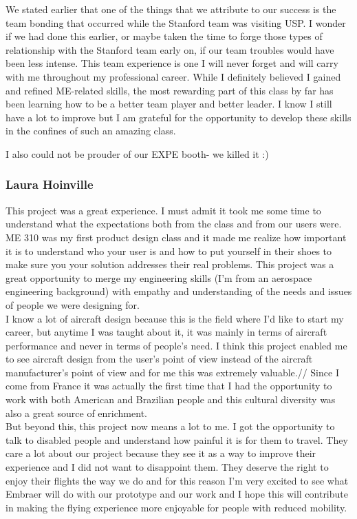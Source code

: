 We stated earlier that one of the things that we attribute to our success is the team bonding that occurred while the Stanford team was visiting USP. I wonder if we had done this earlier, or maybe taken the time to forge those types of relationship with the Stanford team early on, if our team troubles would have been less intense. This team experience is one I will never forget and will carry with me throughout my professional career. While I definitely believed I gained and refined ME-related skills, the most rewarding part of this class by far has been learning how to be a better team player and better leader. I know I still have a lot to improve but I am grateful for the opportunity to develop these skills in the confines of such an amazing class. 

I also could not be prouder of our EXPE booth- we killed it  :)

\subsubsection{Laura Hoinville}

This project was a great experience. I must admit it took me some time to understand what the expectations both from the class and from our users were. ME 310 was my first product design class and it made me realize how important it is to understand who your user is and how to put yourself in their shoes to make sure you your solution addresses their real problems. This project was a great opportunity to merge my engineering skills (I’m from an aerospace engineering background) with empathy and understanding of the needs and issues of people we were designing for.\\

I know a lot of aircraft design because this is the field where I’d like to start my career, but anytime I was taught about it, it was mainly in terms of aircraft performance and never in terms of people’s need. I think this project enabled me to see aircraft design from the user’s point of view instead of the aircraft manufacturer’s point of view and for me this was extremely valuable.//
Since I come from France it was actually the first time that I had the opportunity to work with both American and Brazilian people and this cultural diversity was also a great source of enrichment.\\

But beyond this, this project now means a lot to me. I got the opportunity to talk to disabled people and understand how painful it is for them to travel. They care a lot about our project because they see it as a way to improve their experience and I did not want to disappoint them. They deserve the right to enjoy their flights the way we do and for this reason I’m very excited to see what Embraer will do with our prototype and our work and I hope this will contribute in making the flying experience more enjoyable for people with reduced mobility. 


